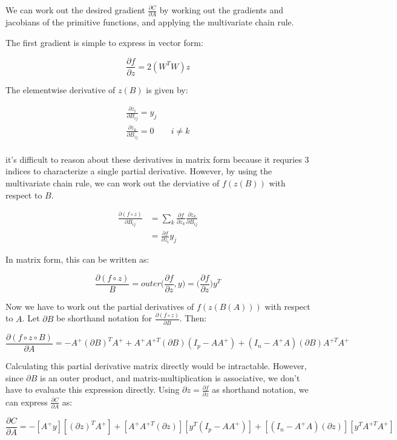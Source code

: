 \documentclass[12]{article}
\begin{document}
We can work out the desired gradient $ \frac{\partial C}{\partial A} $ by working out the gradients and jacobians of the primitive functions, and applying the multivariate chain rule.

The first gradient is simple to express in vector form: 

$$ \frac{\partial f}{\partial z} = 2 (W^T W) z $$

The elementwise derivative of $z(B)$ is given by:

\begin{align*}
\frac{\partial z_i}{\partial B_{ij}} = y_j \\
\frac{\partial z_k}{\partial B_{ij}} = 0  & \:\:\:\: i \neq k \\
\end{align*}

it's difficult to reason about these derivatives in matrix form because it requries $3$ indices to characterize a single partial derivative.  However, by using the multivariate chain rule, we can work out the derviative of $f(z(B)) $ with respect to $B$.

\begin{align*}
\frac{\partial (f \circ z)}{\partial B_{ij}} &= \sum_k \frac{\partial f}{\partial z_k} \frac{\partial z_k}{\partial B_{ij}} \\
&= \frac{\partial f}{\partial z_i} y_j 
\end{align*}

In matrix form, this can be written as:

$$ \frac{\partial (f \circ z)}{B} = outer\Big(\frac{\partial f}{\partial z}, y\Big) = \Big( \frac{\partial f}{\partial z} \Big) y^T $$

Now we have to work out the partial derivatives of $ f(z(B(A))) $ with respect to $A$.  Let $\partial B$ be shorthand notation for $ \frac{\partial (f \circ z)}{\partial B} $.  Then:

$$ \frac{\partial (f \circ z \circ B)}{\partial A} = -A^+ (\partial B)^T A^+ + A^+ A^{+T} (\partial B) (I_p - A A^+) + (I_n - A^+ A) (\partial B) A^{+T} A^+ $$

Calculating this partial derivative matrix directly would be intractable.  However, since $ \partial B $ is an outer product, and matrix-multiplication is associative, we don't have to evaluate this expression directly.  Using $ \partial z = \frac{\partial f}{\partial z} $ as shorthand notation, we can express $ \frac{\partial C}{\partial A} $ as:

$$ \frac{\partial C}{\partial A} = -[A^+ y] [(\partial z)^T A^+] + [A^+ A^{+T} (\partial z)] [y^T (I_p - A A^+)] + [(I_n - A^+ A) (\partial z)] [y^T A^{+T} A^+] $$
\end{document}
